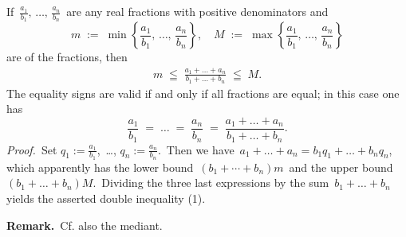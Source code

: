\documentclass[12pt]{article}
\theoremstyle{definition}
\begin{document}
If\, $\displaystyle\frac{a_1}{b_1},\,\ldots,\,\frac{a_n}{b_n}$\, are any  real fractions with positive denominators and
 $$m \;:=\; \min\left\{\frac{a_1}{b_1},\,\ldots,\,\frac{a_n}{b_n}\right\}, \quad 
   M \;:=\; \max\left\{\frac{a_1}{b_1},\,\ldots,\,\frac{a_n}{b_n}\right\}$$
are  of the fractions, then
\begin{align}
m \;\leqq\; \frac{a_1\!+\!\ldots\!+\!a_n}{b_1\!+\!\ldots\!+\!b_n} \;\leqq\; M.
\end{align}
The equality signs are valid if and only if all fractions are equal; in this case one has 
 $$\frac{a_1}{b_1} \;=\; \ldots \;=\; \frac{a_n}{b_n} \;=\; \frac{a_1\!+\!\ldots+\!a_n}{b_1\!+\!\ldots\!+\!b_n}.$$
{\em Proof.}\, Set\; $\displaystyle q_1 := \frac{a_1}{b_1}$,\, \ldots,\; $\displaystyle q_n := \frac{a_n}{b_n}$.\, Then we have\, 
$a_1\!+\!\ldots\!+\!a_n = b_1q_1\!+\!\ldots\!+\!b_nq_n$,\, which apparently has the lower bound\, $(b_1\!+\cdots+\!b_n)m$\, and the upper bound\, $(b_1\!+\ldots+\!b_n)M$.\, Dividing the three last expressions by the sum\,  $b_1\!+\ldots+\!b_n$\, yields the asserted double inequality (1).


\textbf{Remark.}\, Cf. also the mediant.
\end{document}
